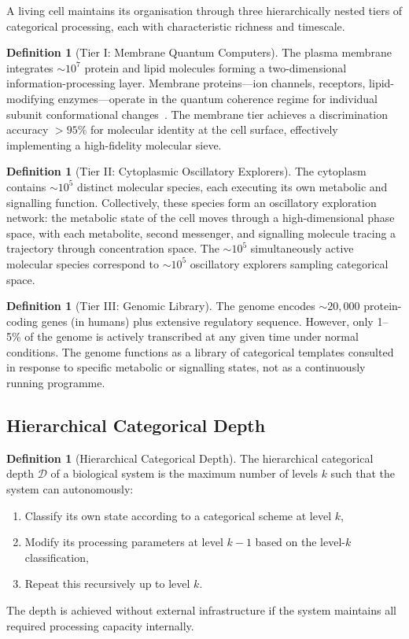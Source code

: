 \documentclass[12pt,a4paper]{article}
\theoremstyle{definition}
\newtheorem{definition}[theorem]{Definition}
\theoremstyle{remark}
\newcommand{\Dcat}{\mathcal{D}}
\begin{document}
A living cell maintains its organisation through three hierarchically nested tiers of categorical processing, each with characteristic richness and timescale.

\begin{definition}[Tier I: Membrane Quantum Computers]
\label{def:tier1}
The plasma membrane integrates $\sim\!10^7$ protein and lipid molecules forming a two-dimensional information-processing layer. Membrane proteins---ion channels, receptors, lipid-modifying enzymes---operate in the quantum coherence regime for individual subunit conformational changes~\cite{Fleming2011}. The membrane tier achieves a discrimination accuracy $>95\%$ for molecular identity at the cell surface, effectively implementing a high-fidelity molecular sieve.
\end{definition}

\begin{definition}[Tier II: Cytoplasmic Oscillatory Explorers]
\label{def:tier2}
The cytoplasm contains $\sim\!10^5$ distinct molecular species, each executing its own metabolic and signalling function. Collectively, these species form an oscillatory exploration network: the metabolic state of the cell moves through a high-dimensional phase space, with each metabolite, second messenger, and signalling molecule tracing a trajectory through concentration space. The $\sim\!10^5$ simultaneously active molecular species correspond to $\sim\!10^5$ oscillatory explorers sampling categorical space.
\end{definition}

\begin{definition}[Tier III: Genomic Library]
\label{def:tier3}
The genome encodes $\sim\!20,000$ protein-coding genes (in humans) plus extensive regulatory sequence. However, only 1--5\% of the genome is actively transcribed at any given time under normal conditions. The genome functions as a library of categorical templates consulted in response to specific metabolic or signalling states, not as a continuously running programme.
\end{definition}

\subsection{Hierarchical Categorical Depth}

\begin{definition}[Hierarchical Categorical Depth]
\label{def:depth}
The hierarchical categorical depth $\Dcat$ of a biological system is the maximum number of levels $k$ such that the system can autonomously:
\begin{enumerate}[(1)]
  \item Classify its own state according to a categorical scheme at level $k$,
  \item Modify its processing parameters at level $k-1$ based on the level-$k$ classification,
  \item Repeat this recursively up to level $k$.
\end{enumerate}
The depth is achieved without external infrastructure if the system maintains all required processing capacity internally.
\end{definition}
\end{document}
